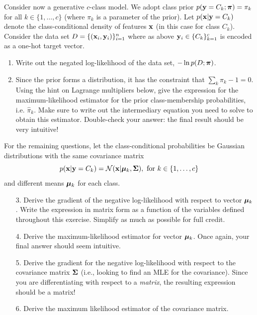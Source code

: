 \documentclass[submit]{harvardml}
\begin{document}
\begin{problem}

  Consider now a generative $c$-class model.  We adopt class prior
  $p(\mathbf{y} = C_k; \boldsymbol{\pi}) = \pi_k$ for all $k \in \{1, \ldots, c\}$
(where $\pi_k$ is a parameter of the prior).
%
Let  $p(\mathbf{x}|\mathbf{y}=C_k)$ denote
the class-conditional density of features $\mathbf{x}$ (in this
case for class $C_k$). Consider the data set $D = \{(\mathbf{x}_i,
\mathbf{y}_i)\}_{i=1}^n$ where as above $\mathbf{y}_i \in \{C_k\}_{k=1}^c$ is
encoded as a one-hot target vector.
%
\begin{enumerate}
  \item Write out the negated log-likelihood of the data set,
    $-\ln p(D ; \boldsymbol{\pi})$.
%
  \item Since the prior forms a distribution, it has the constraint that
    $\sum_k\pi_k - 1 = 0$.  Using the hint on
Lagrange multipliers below, give the
    expression for the maximum-likelihood estimator for the prior
    class-membership probabilities, i.e.
    $\hat \pi_k.$
    Make sure to write out the intermediary equation you need
    to solve to obtain this estimator. Double-check your answer: the final
    result should be very intuitive!
\end{enumerate}

    For the remaining questions, let the
    class-conditional probabilities be Gaussian distributions with
the same covariance matrix
    $$p(\mathbf{x} | \mathbf{y} = C_k) = \mathcal{N}(\mathbf{x} |  \boldsymbol{\mu}_k, \mathbf{\Sigma}), \text{\ for\ }k \in \{1,\ldots, c\}$$
%
and different means $\boldsymbol{\mu}_k$ for each class.
%
    \begin{enumerate}
  \item[3.] Derive the gradient of the negative log-likelihood with respect to vector $\boldsymbol{\mu}_k$.
    Write the expression in matrix form as a function of the variables defined
    throughout this exercise. Simplify as much as possible for full credit.
  \item[4.] Derive the maximum-likelihood estimator for vector $\boldsymbol{\mu}_k$. Once
    again, your final answer should seem intuitive.
  \item[5.] Derive the gradient for the negative log-likelihood with respect to the
    covariance matrix $\mathbf{\Sigma}$ (i.e., looking
to find an MLE for the covariance).
Since you are differentiating with respect to a
    \emph{matrix}, the resulting expression should be a matrix!
%
  \item[6.] Derive the maximum likelihood estimator of the covariance matrix.
\end{enumerate}


\end{problem}
\end{document}
